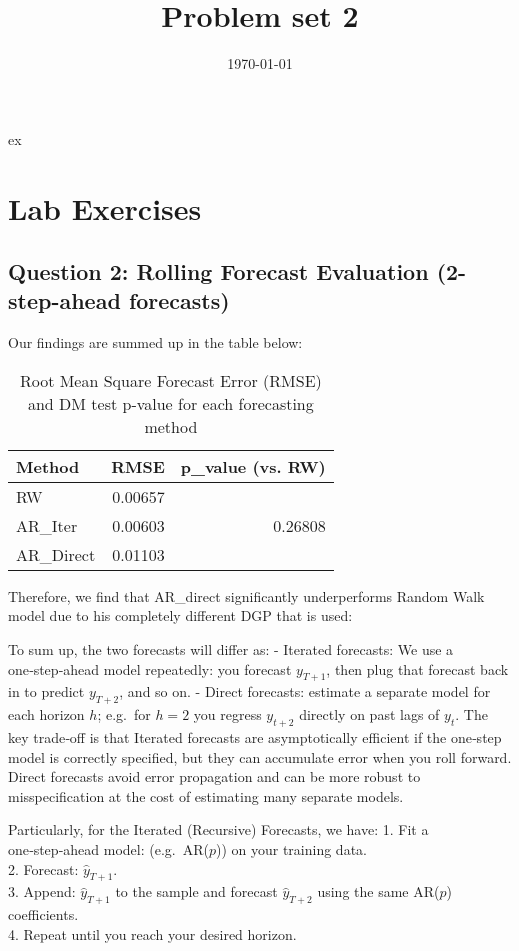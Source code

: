 \documentclass[a4paper,12pt]{article}
\title{Problem set 2}
\date{\today} %
\makeatletter
\renewcommand{\maketitle}{%
	\noindent{\bfseries\scshape\large\@title\ \mdseries\upshape(\@date)}\par
	\vskip 1 ex}
\theoremstyle{remark}
\makeatother
\begin{document}
	
\onehalfspacing
\maketitle
\thispagestyle{fancy}


\section*{Lab Exercises}
\subsection*{Question 2: Rolling Forecast Evaluation (2-step-ahead forecasts)}
    Our findings are summed up in the table below:
     
    \begin{table}[H]
    \centering
    \begin{tabular}{lrr}
      \hline
    Method & RMSE & p\_value (vs. RW) \\ 
      \hline
    RW & 0.00657 &  \\ 
      AR\_Iter & 0.00603 & 0.26808 \\ 
      AR\_Direct & 0.01103 &  \\ 
       \hline
    \end{tabular}
    \caption{Root Mean Square Forecast Error (RMSE) and DM test p-value for each forecasting method} 
    \label{tab:rmse}
    \end{table}
    Therefore, we find that AR\_direct significantly underperforms Random Walk model due to his completely different DGP that is used:
    


To sum up, the two forecasts will differ as:
- Iterated forecasts: We use a one‑step‑ahead model repeatedly: you forecast \(y_{T+1}\), then plug that forecast back in to predict \(y_{T+2}\), and so on.  
- Direct forecasts: estimate a separate model for each horizon \(h\); e.g.\ for \(h=2\) you regress \(y_{t+2}\) directly on past lags of \(y_t\).  
The key trade‑off is that Iterated forecasts are asymptotically efficient if the one‑step model is correctly specified, but they can accumulate error when you roll forward. Direct forecasts avoid error propagation and can be more robust to misspecification at the cost of estimating many separate models.

Particularly, for the Iterated (Recursive) Forecasts, we have:
1. Fit a one‑step‑ahead model: (e.g.\ AR(\(p\))) on your training data.  \\
2. Forecast: \( \hat y_{T+1} \).  \\
3. Append: \( \hat y_{T+1} \) to the sample and forecast \( \hat y_{T+2} \) using the same AR(\(p\)) coefficients.  \\
4. Repeat until you reach your desired horizon.  \\
\end{document}
